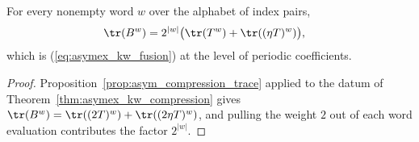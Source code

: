 \begin{theorem}
    \label{thm:asymex_kw_trace}
    \leanok
    For every nonempty word $w$ over the alphabet of index pairs,
    \begin{align}
        \tr(B^w) & =2^{|w|}\bigl(\tr(T^w)+\tr((\eta T)^w)\bigr),
        \label{eq:asymex_kw_trace}
    \end{align}
    which is (\ref{eq:asymex_kw_fusion}) at the level of periodic
    coefficients.
\end{theorem}

\begin{proof}
    \leanok
    Proposition~\ref{prop:asym_compression_trace} applied to the datum of
    Theorem~\ref{thm:asymex_kw_compression} gives
    $\tr(B^w)=\tr((2T)^w)+\tr((2\eta T)^w)$, and pulling the weight $2$ out
    of each word evaluation contributes the factor $2^{|w|}$.
\end{proof}

